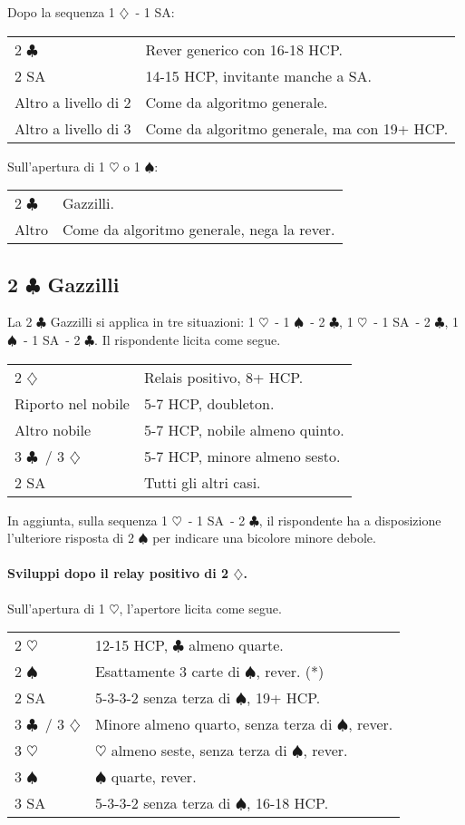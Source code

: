 \documentclass[a4paper,10pt]{article}
\renewcommand{\c}{$\clubsuit$\xspace}
\renewcommand{\d}{$\diamondsuit$\xspace}
\newcommand{\h}{$\heartsuit$\xspace}
\newcommand{\s}{$\spadesuit$\xspace}
\newcommand{\sa}{SA\xspace}
\newcommand{\smallspace}{\vskip0.3cm}
\newenvironment{twocol}
  {\smallspace\noindent\begin{tabular}{l p{0.78\textwidth}}}
  {\end{tabular}\smallspace}
\begin{document}
\noindent Dopo la sequenza 1 \d\ - 1 \sa:
\begin{twocol}
	2 \c & Rever generico con 16-18 HCP.\\
	2 \sa & 14-15 HCP, invitante manche a \sa.\\
	Altro a livello di 2 & Come da algoritmo generale.\\
	Altro a livello di 3 & Come da algoritmo generale, ma con 19+ HCP.
\end{twocol}

\color{black}

\noindent Sull'apertura di 1 \h o 1 \s:
\begin{twocol}
  2 \c & Gazzilli. \\
  Altro & Come da algoritmo generale, nega la rever.
\end{twocol}


\subsection{2 \c Gazzilli}

La 2 \c Gazzilli si applica in tre situazioni: 1 \h\ - 1 \s\ - 2 \c, 1 \h\ - 1 \sa\ - 2 \c, 1 \s\ - 1 \sa\ - 2 \c.
Il rispondente licita come segue.

\begin{twocol}
  2 \d & Relais positivo, 8+ HCP. \\
  Riporto nel nobile & 5-7 HCP, doubleton. \\
  Altro nobile & 5-7 HCP, nobile almeno quinto. \\
  3 \c\ / 3 \d & 5-7 HCP, minore almeno sesto. \\
  2 \sa & Tutti gli altri casi.
\end{twocol}

In aggiunta, sulla sequenza 1 \h\ - 1 \sa\ - 2 \c, il rispondente ha a disposizione l'ulteriore risposta di 2 \s per indicare una bicolore minore debole.

\paragraph{Sviluppi dopo il relay positivo di 2 \d.}
Sull'apertura di 1 \h, l'apertore licita come segue.

\begin{twocol}
  2 \h & 12-15 HCP, \c almeno quarte. \\
  2 \s & Esattamente 3 carte di \s, rever. (*)\\
  2 \sa & 5-3-3-2 senza terza di \s, 19+ HCP. \\
  3 \c\ / 3 \d & Minore almeno quarto, senza terza di \s, rever. \\
  3 \h & \h almeno seste, senza terza di \s, rever. \\
  3 \s & \s quarte, rever. \\
  3 \sa & 5-3-3-2 senza terza di \s, 16-18 HCP.
\end{twocol}
\end{document}
